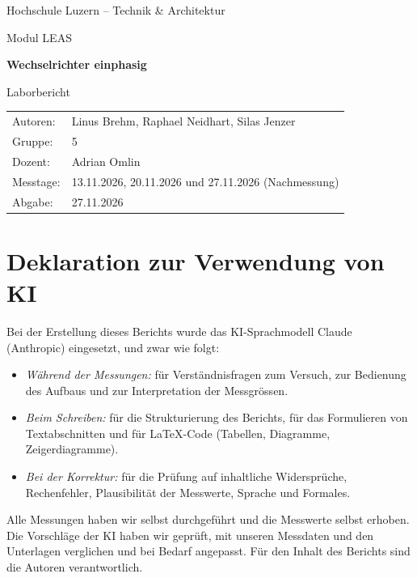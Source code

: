 \documentclass[a4paper,11pt]{scrartcl}
\begin{document}
\begin{titlepage}
  \centering
  \vspace*{1.5cm}
  {\large Hochschule Luzern – Technik \& Architektur\par}
  {\large Modul LEAS\par}
  \vspace{2.5cm}
  {\Huge\bfseries Wechselrichter einphasig\par}
  \vspace{0.8cm}
  {\Large Laborbericht\par}
  \vspace{2.5cm}
  \begin{tabular}{@{}ll@{}}
    Autoren:      & Linus Brehm, Raphael Neidhart, Silas Jenzer  \\[2pt]
    Gruppe: & 5 \\[2pt]
    Dozent:         & Adrian Omlin \\[2pt]
    Messtage:       & 13.11.2026, 20.11.2026 und 27.11.2026 (Nachmessung) \\[2pt]
    Abgabe:         & 27.11.2026
  \end{tabular}
  \vfill
\end{titlepage}

\tableofcontents
{}
\clearpage









\section*{Deklaration zur Verwendung von KI}

Bei der Erstellung dieses Berichts wurde das KI-Sprachmodell Claude (Anthropic) eingesetzt, und zwar wie folgt:
\begin{itemize}
  \item \emph{Während der Messungen:} für Verständnisfragen zum Versuch, zur Bedienung des Aufbaus und zur Interpretation der Messgrössen.
  \item \emph{Beim Schreiben:} für die Strukturierung des Berichts, für das Formulieren von Textabschnitten und für LaTeX-Code (Tabellen, Diagramme, Zeigerdiagramme).
  \item \emph{Bei der Korrektur:} für die Prüfung auf inhaltliche Widersprüche, Rechenfehler, Plausibilität der Messwerte, Sprache und Formales.
\end{itemize}
Alle Messungen haben wir selbst durchgeführt und die Messwerte selbst erhoben. Die Vorschläge der KI haben wir geprüft, mit unseren Messdaten und den Unterlagen verglichen und bei Bedarf angepasst. Für den Inhalt des Berichts sind die Autoren verantwortlich.
\end{document}
